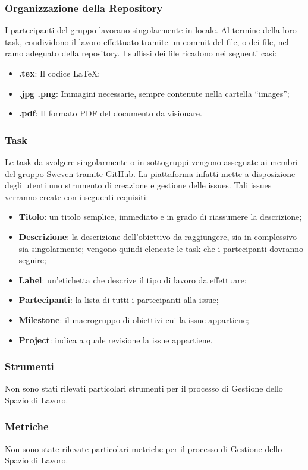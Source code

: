 \subsubsection{Organizzazione della Repository}
I partecipanti del gruppo lavorano singolarmente in locale. Al termine della loro task, condividono 
il lavoro effettuato tramite un commit del file, o dei file, nel ramo adeguato della repository.
I suffissi dei file ricadono nei seguenti casi:
\begin{itemize}
    \item \textbf{.tex}: Il codice \LaTeX;
    \item \textbf{.jpg .png}: Immagini necessarie, sempre contenute nella cartella ``images'';
    \item \textbf{.pdf}: Il formato PDF del documento da visionare.
\end{itemize}
\subsubsection{Task}
Le task da svolgere singolarmente o in sottogruppi vengono assegnate ai membri del gruppo Sweven tramite
GitHub. La piattaforma infatti mette a disposizione degli utenti uno strumento di creazione e gestione delle 
issues. Tali issues verranno create con i seguenti requisiti:
\begin{itemize}
    \item \textbf{Titolo}: un titolo semplice, immediato e in grado di riassumere la descrizione;
    \item \textbf{Descrizione}: la descrizione dell'obiettivo da raggiungere, sia in complessivo sia singolarmente; 
                                vengono quindi elencate le task che i partecipanti dovranno seguire;
    \item \textbf{Label}: un'etichetta che descrive il tipo di lavoro da effettuare;
    \item \textbf{Partecipanti}: la lista di tutti i partecipanti alla issue;
    \item \textbf{Milestone}: il macrogruppo di obiettivi cui la issue appartiene;
    \item \textbf{Project}: indica a quale revisione la issue appartiene.
\end{itemize}

\subsubsection{Strumenti}
Non sono stati rilevati particolari strumenti per il processo di Gestione dello Spazio di Lavoro.
\subsubsection{Metriche} 
Non sono state rilevate particolari metriche per il processo di Gestione dello Spazio di Lavoro.